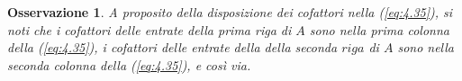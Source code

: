 \documentclass{book}
\newtheorem{osservazione}{Osservazione}
\begin{document}
\begin{osservazione}
  A proposito della disposizione dei cofattori nella (\ref{eq:4.35}), si noti che i cofattori delle entrate della
  prima \textit{riga} di $A$ sono nella prima \textit{colonna} della (\ref{eq:4.35}), i cofattori delle entrate
  della della seconda $riga$ di $A$ sono nella seconda \textit{colonna} della (\ref{eq:4.35}), e così via.
\end{osservazione}
\end{document}
